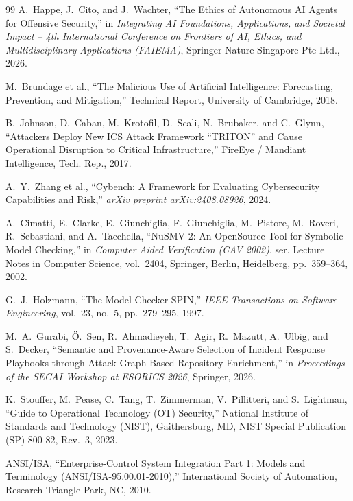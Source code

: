 \documentclass[target=mst,aauheader=aics,style=]{thud}
\begin{document}
\begin{thebibliography}{99}
A.~Happe, J.~Cito, and J.~Wachter,
``The Ethics of Autonomous AI Agents for Offensive Security,''
in \emph{Integrating AI Foundations, Applications, and Societal Impact -- 4th International Conference on Frontiers of AI, Ethics, and Multidisciplinary Applications (FAIEMA)}, Springer Nature Singapore Pte Ltd., 2026.

M.~Brundage et al.,
``The Malicious Use of Artificial Intelligence: Forecasting, Prevention, and Mitigation,''
Technical Report, University of Cambridge, 2018.

B.~Johnson, D.~Caban, M.~Krotofil, D.~Scali, N.~Brubaker, and C.~Glynn,
``Attackers Deploy New {ICS} Attack Framework ``{TRITON}'' and Cause Operational Disruption to Critical Infrastructure,''
FireEye / Mandiant Intelligence, Tech. Rep., 2017.

A.~Y.~Zhang et al.,
``Cybench: A Framework for Evaluating Cybersecurity Capabilities and Risk,''
\emph{arXiv preprint arXiv:2408.08926}, 2024.

A.~Cimatti, E.~Clarke, E.~Giunchiglia, F.~Giunchiglia, M.~Pistore, M.~Roveri, R.~Sebastiani, and A.~Tacchella,
``NuSMV 2: An OpenSource Tool for Symbolic Model Checking,''
in \emph{Computer Aided Verification (CAV 2002)}, ser. Lecture Notes in Computer Science, vol.~2404, Springer, Berlin, Heidelberg, pp.~359--364, 2002.

G.~J.~Holzmann,
``The Model Checker SPIN,''
\emph{IEEE Transactions on Software Engineering}, vol.~23, no.~5, pp.~279--295, 1997.

M.~A.~Gurabi, {\"O}.~Sen, R.~Ahmadieyeh, T.~Agir, R.~Mazutt, A.~Ulbig, and S.~Decker,
``Semantic and Provenance-Aware Selection of Incident Response Playbooks through Attack-Graph-Based Repository Enrichment,''
in \emph{Proceedings of the SECAI Workshop at ESORICS 2026}, Springer, 2026.

K.~Stouffer, M.~Pease, C.~Tang, T.~Zimmerman, V.~Pillitteri, and S.~Lightman, 
``Guide to Operational Technology ({OT}) Security,'' 
National Institute of Standards and Technology (NIST), Gaithersburg, MD, 
NIST Special Publication (SP) 800-82, Rev.~3, 2023.

ANSI/ISA,
``Enterprise-Control System Integration Part 1: Models and Terminology (ANSI/ISA-95.00.01-2010),''
International Society of Automation, Research Triangle Park, NC, 2010.

\end{thebibliography}
\end{document}
